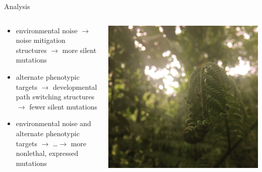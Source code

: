 \begin{frame}{Analysis}
\begin{columns}
\begin{column}{0.6\textwidth}
\begin{itemize}
	\item environmental noise $\rightarrow$ noise mitigation structures $\rightarrow$ more silent mutations
    \item alternate phenotypic targets $\rightarrow$ developmental path switching structures $\rightarrow$ fewer silent mutations
    \item environmental noise and alternate phenotypic targets $\rightarrow$ \ldots $\rightarrow$ more nonlethal, expressed mutations
 \end{itemize}
\end{column}
\begin{column}{0.4\textwidth}
\begin{center}
\includegraphics[width=\textwidth,trim={18cm 0 27cm 0},clip]{img/tropical_fern}
\end{center}
\end{column}
\end{columns}
\end{frame}
